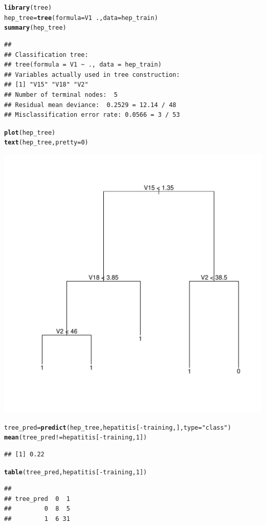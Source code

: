 \documentclass{article}\usepackage[]{graphicx}\usepackage[]{color}
\makeatletter
\newcommand{\hlnum}[1]{\textcolor[rgb]{0.686,0.059,0.569}{#1}}%
\newcommand{\hlstr}[1]{\textcolor[rgb]{0.192,0.494,0.8}{#1}}%
\newcommand{\hlopt}[1]{\textcolor[rgb]{0,0,0}{#1}}%
\newcommand{\hlstd}[1]{\textcolor[rgb]{0.345,0.345,0.345}{#1}}%
\newcommand{\hlkwb}[1]{\textcolor[rgb]{0.69,0.353,0.396}{#1}}%
\newcommand{\hlkwc}[1]{\textcolor[rgb]{0.333,0.667,0.333}{#1}}%
\newcommand{\hlkwd}[1]{\textcolor[rgb]{0.737,0.353,0.396}{\textbf{#1}}}%
\newenvironment{kframe}{%
 \def\at@end@of@kframe{}%
 \ifinner\ifhmode%
  \def\at@end@of@kframe{\end{minipage}}%
  \begin{minipage}{\columnwidth}%
 \fi\fi%
 \def\FrameCommand##1{\hskip\@totalleftmargin \hskip-\fboxsep
 \colorbox{shadecolor}{##1}\hskip-\fboxsep
     \hskip-\linewidth \hskip-\@totalleftmargin \hskip\columnwidth}%
 \MakeFramed {\advance\hsize-\width
   \@totalleftmargin\z@ \linewidth\hsize
   \@setminipage}}%
 {\par\unskip\endMakeFramed%
 \at@end@of@kframe}
\newenvironment{knitrout}{}{} %
\makeatother
\begin{document}
\begin{knitrout}
\color{fgcolor}\begin{kframe}
\begin{alltt}
\hlkwd{library}\hlstd{(tree)}
\hlstd{hep_tree} \hlkwb{=} \hlkwd{tree}\hlstd{(}\hlkwc{formula} \hlstd{= V1} \hlopt{~} \hlstd{.,} \hlkwc{data} \hlstd{= hep_train)}
\hlkwd{summary}\hlstd{(hep_tree)}
\end{alltt}
\begin{verbatim}
## 
## Classification tree:
## tree(formula = V1 ~ ., data = hep_train)
## Variables actually used in tree construction:
## [1] "V15" "V18" "V2" 
## Number of terminal nodes:  5 
## Residual mean deviance:  0.2529 = 12.14 / 48 
## Misclassification error rate: 0.0566 = 3 / 53
\end{verbatim}
\begin{alltt}
\hlkwd{plot}\hlstd{(hep_tree)}
\hlkwd{text}\hlstd{(hep_tree ,}\hlkwc{pretty} \hlstd{=}\hlnum{0}\hlstd{)}
\end{alltt}
\end{kframe}
\includegraphics[width=0.40\linewidth]{figure/unnamed-chunk-14-1} 
\begin{kframe}\begin{alltt}
\hlstd{tree_pred} \hlkwb{=} \hlkwd{predict}\hlstd{(hep_tree, hepatitis[}\hlopt{-}\hlstd{training,],} \hlkwc{type} \hlstd{=} \hlstr{"class"}\hlstd{)}
\hlkwd{mean}\hlstd{(tree_pred} \hlopt{!=} \hlstd{hepatitis[}\hlopt{-}\hlstd{training,}\hlnum{1}\hlstd{])}
\end{alltt}
\begin{verbatim}
## [1] 0.22
\end{verbatim}
\begin{alltt}
\hlkwd{table}\hlstd{(tree_pred, hepatitis[}\hlopt{-}\hlstd{training,}\hlnum{1}\hlstd{])}
\end{alltt}
\begin{verbatim}
##          
## tree_pred  0  1
##         0  8  5
##         1  6 31
\end{verbatim}
\end{kframe}
\end{knitrout}
\end{document}
